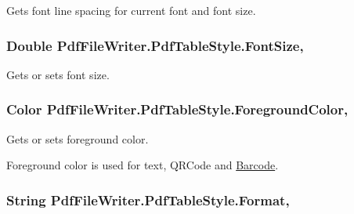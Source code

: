 Gets font line spacing for current font and font size. 

\subsubsection[{\texorpdfstring{Font\+Size}{FontSize}}]{\setlength{\rightskip}{0pt plus 5cm}Double Pdf\+File\+Writer.\+Pdf\+Table\+Style.\+Font\+Size\hspace{0.3cm}{\ttfamily [get]}, {\ttfamily [set]}}\hypertarget{class_pdf_file_writer_1_1_pdf_table_style_a2de92e201155939848ad867637afa08b}{}\label{class_pdf_file_writer_1_1_pdf_table_style_a2de92e201155939848ad867637afa08b}


Gets or sets font size. 

\subsubsection[{\texorpdfstring{Foreground\+Color}{ForegroundColor}}]{\setlength{\rightskip}{0pt plus 5cm}Color Pdf\+File\+Writer.\+Pdf\+Table\+Style.\+Foreground\+Color\hspace{0.3cm}{\ttfamily [get]}, {\ttfamily [set]}}\hypertarget{class_pdf_file_writer_1_1_pdf_table_style_a376023045ec65bbd5c72df749cf8620c}{}\label{class_pdf_file_writer_1_1_pdf_table_style_a376023045ec65bbd5c72df749cf8620c}


Gets or sets foreground color. 

Foreground color is used for text, Q\+R\+Code and \hyperlink{class_pdf_file_writer_1_1_barcode}{Barcode}. 
\subsubsection[{\texorpdfstring{Format}{Format}}]{\setlength{\rightskip}{0pt plus 5cm}String Pdf\+File\+Writer.\+Pdf\+Table\+Style.\+Format\hspace{0.3cm}{\ttfamily [get]}, {\ttfamily [set]}}\hypertarget{class_pdf_file_writer_1_1_pdf_table_style_af66d0e0252bfaf5f4ae226e43d70f093}{}\label{class_pdf_file_writer_1_1_pdf_table_style_af66d0e0252bfaf5f4ae226e43d70f093}


